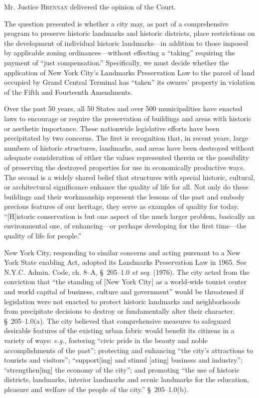 

\opinion Mr. Justice \textsc{Brennan} delivered the opinion of the Court.

The question presented is whether a city may, as part of a comprehensive program
to preserve historic landmarks and historic districts, place restrictions on the
development of individual historic landmarks---in addition to those imposed by
applicable zoning ordinances---without effecting a ``taking'' requiring the
payment of ``just compensation.'' Specifically, we must decide whether the
application of New York City's Landmarks Preservation Law to the parcel of land
occupied by Grand Central Terminal has ``taken'' its owners' property in
violation of the Fifth and Fourteenth Amendments.





Over the past 50 years, all 50 States and over 500 municipalities have enacted
laws to encourage or require the preservation of buildings and areas with
historic or aesthetic importance. These nationwide legislative efforts have been
precipitated by two concerns. The first is recognition that, in recent years,
large numbers of historic structures, landmarks, and areas have been destroyed
without adequate consideration of either the values represented therein or the
possibility of preserving the destroyed properties for use in economically
productive ways. The second is a widely shared belief that structures with
special historic, cultural, or architectural significance enhance the quality of
life for all. Not only do these buildings and their workmanship represent the
lessons of the past and embody precious features of our heritage, they serve as
examples of quality for today. ``[H]istoric conservation is but one aspect of
the much larger problem, basically an environmental one, of enhancing---or
perhaps developing for the first time---the quality of life for people.''

New York City, responding to similar concerns and acting pursuant to a New York
State enabling Act, adopted its Landmarks Preservation Law in 1965. See N.Y.C.
Admin. Code, ch. 8--A, \S~205--1.0 \textit{et seq}. (1976). The city acted from
the conviction that ``the standing of [New York City] as a world-wide tourist
center and world capital of business, culture and government'' would be
threatened if legislation were not enacted to protect historic landmarks and
neighborhoods from precipitate decisions to destroy or fundamentally alter their
character. \S~205--1.0(a). The city believed that comprehensive measures to
safeguard desirable features of the existing urban fabric would benefit its
citizens in a variety of ways: \textit{e.g.}, fostering ``civic pride in the
beauty and noble accomplishments of the past''; protecting and enhancing ``the
city's attractions to tourists and visitors''; ``support[ing] and stimul [ating]
business and industry''; ``strengthen[ing] the economy of the city''; and
promoting ``the use of historic districts, landmarks, interior landmarks and
scenic landmarks for the education, pleasure and welfare of the people of the
city.'' \S~205--1.0(b).

